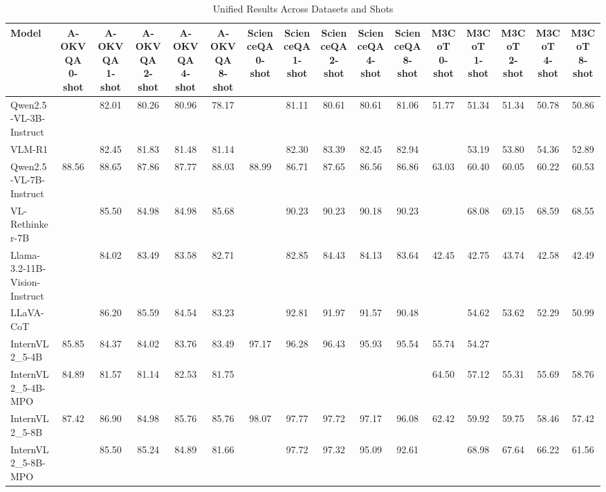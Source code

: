 \begin{table}
\caption{Unified Results Across Datasets and Shots}
\label{tab:all_results}
\begin{tabular}{lccccccccccccccc}
\toprule
Model & A-OKVQA 0-shot & A-OKVQA 1-shot & A-OKVQA 2-shot & A-OKVQA 4-shot & A-OKVQA 8-shot & ScienceQA 0-shot & ScienceQA 1-shot & ScienceQA 2-shot & ScienceQA 4-shot & ScienceQA 8-shot & M3CoT 0-shot & M3CoT 1-shot & M3CoT 2-shot & M3CoT 4-shot & M3CoT 8-shot \\
\midrule
Qwen2.5-VL-3B-Instruct &  & 82.01 & 80.26 & 80.96 & 78.17 &  & 81.11 & 80.61 & 80.61 & 81.06 & 51.77 & 51.34 & 51.34 & 50.78 & 50.86 \\
VLM-R1 &  & 82.45 & 81.83 & 81.48 & 81.14 &  & 82.30 & 83.39 & 82.45 & 82.94 &  & 53.19 & 53.80 & 54.36 & 52.89 \\
Qwen2.5-VL-7B-Instruct & 88.56 & 88.65 & 87.86 & 87.77 & 88.03 & 88.99 & 86.71 & 87.65 & 86.56 & 86.86 & 63.03 & 60.40 & 60.05 & 60.22 & 60.53 \\
VL-Rethinker-7B &  & 85.50 & 84.98 & 84.98 & 85.68 &  & 90.23 & 90.23 & 90.18 & 90.23 &  & 68.08 & 69.15 & 68.59 & 68.55 \\
Llama-3.2-11B-Vision-Instruct &  & 84.02 & 83.49 & 83.58 & 82.71 &  & 82.85 & 84.43 & 84.13 & 83.64 & 42.45 & 42.75 & 43.74 & 42.58 & 42.49 \\
LLaVA-CoT &  & 86.20 & 85.59 & 84.54 & 83.23 &  & 92.81 & 91.97 & 91.57 & 90.48 &  & 54.62 & 53.62 & 52.29 & 50.99 \\
InternVL2_5-4B & 85.85 & 84.37 & 84.02 & 83.76 & 83.49 & 97.17 & 96.28 & 96.43 & 95.93 & 95.54 & 55.74 & 54.27 &  &  &  \\
InternVL2_5-4B-MPO & 84.89 & 81.57 & 81.14 & 82.53 & 81.75 &  &  &  &  &  & 64.50 & 57.12 & 55.31 & 55.69 & 58.76 \\
InternVL2_5-8B & 87.42 & 86.90 & 84.98 & 85.76 & 85.76 & 98.07 & 97.77 & 97.72 & 97.17 & 96.08 & 62.42 & 59.92 & 59.75 & 58.46 & 57.42 \\
InternVL2_5-8B-MPO &  & 85.50 & 85.24 & 84.89 & 81.66 &  & 97.72 & 97.32 & 95.09 & 92.61 &  & 68.98 & 67.64 & 66.22 & 61.56 \\
\bottomrule
\end{tabular}
\end{table}
